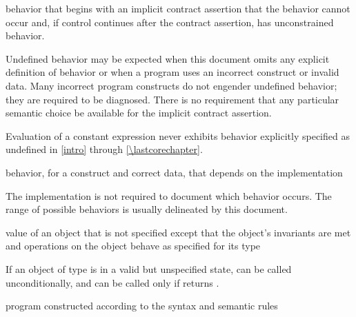 %
behavior that begins with
an implicit contract assertion
that the behavior cannot occur
and, if control continues after the contract assertion,
has unconstrained behavior.

\begin{defnote}
Undefined behavior may be expected when
this document omits any explicit
definition of behavior or when a program uses an incorrect construct or invalid data.
Many incorrect program constructs do
not engender undefined behavior; they are required to be diagnosed.
There is no requirement that any particular semantic choice
be available for the implicit contract assertion.
\end{defnote}

\begin{defnote}
Evaluation of a constant expression never exhibits behavior explicitly
specified as undefined in \ref{intro} through \ref{\lastcorechapter}.
\end{defnote}

%
behavior, for a  construct and correct data, that
depends on the implementation

\begin{defnote}
The implementation is not required to
document which behavior occurs. The range of
possible behaviors is usually delineated by this document.
\end{defnote}

%
value of an object that is not specified except that the object's invariants are
met and operations on the object behave as specified for its type

\begin{example}
If an object  of type  is in a
valid but unspecified state,  can be called unconditionally,
and  can be called only if  returns
.
\end{example}

%
\Cpp{} program constructed according to the syntax and semantic rules

